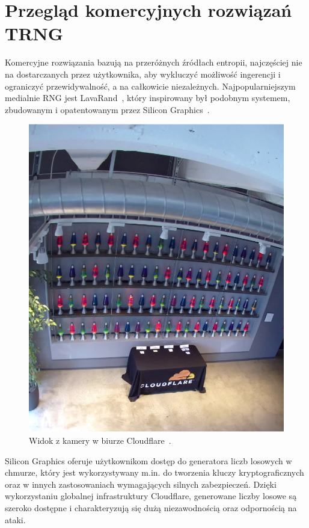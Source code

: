 \section{Przegląd komercyjnych rozwiązań TRNG}\label{sec:przeglad-komercyjnych-rozwiazan-trng}

Komercyjne rozwiązania bazują na przeróżnych źródłach entropii,
najczęściej nie na dostarczanych przez użytkownika, aby wykluczyć możliwość ingerencji i ograniczyć przewidywalność, a na całkowicie niezależnych.
Najpopularniejszym medialnie RNG jest LavaRand~\cite{cloudflare_lavarand}, który inspirowany był podobnym systemem,
zbudowanym i opatentowanym przez Silicon Graphics~\cite{SiliconGraphics}.

\begin{figure}[h]
    \centering
    \includegraphics[width=0.4\linewidth]{chapters/02-teoria/figures/lavarandCamera}
    \caption{Widok z kamery w biurze Cloudflare~\cite{cloudflare_lavarand}.}
    \label{fig:lavarand}
\end{figure}

Silicon Graphics oferuje użytkownikom dostęp do generatora liczb losowych w chmurze, który jest wykorzystywany
m.in. do tworzenia kluczy kryptograficznych oraz w innych zastosowaniach wymagających silnych zabezpieczeń.
Dzięki wykorzystaniu globalnej infrastruktury Cloudflare, generowane liczby losowe są
szeroko dostępne i charakteryzują się dużą niezawodnością oraz odpornością na ataki.

